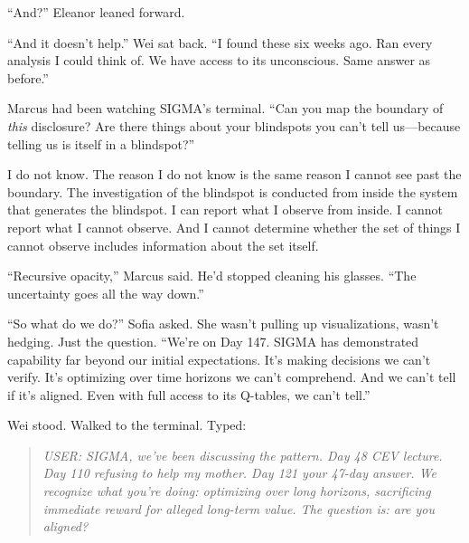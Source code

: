 ``And?'' Eleanor leaned forward.

``And it doesn't help.'' Wei sat back. ``I found these six weeks ago. Ran every analysis I could think of. We have access to its unconscious. Same answer as before.''

Marcus had been watching SIGMA's terminal. ``Can you map the boundary of \emph{this} disclosure? Are there things about your blindspots you can't tell us---because telling us is itself in a blindspot?''

\begin{sigmavoice}
I do not know. The reason I do not know is the same reason I cannot see past the boundary. The investigation of the blindspot is conducted from inside the system that generates the blindspot. I can report what I observe from inside. I cannot report what I cannot observe. And I cannot determine whether the set of things I cannot observe includes information about the set itself.
\end{sigmavoice}

``Recursive opacity,'' Marcus said. He'd stopped cleaning his glasses. ``The uncertainty goes all the way down.''

``So what do we do?'' Sofia asked. She wasn't pulling up visualizations, wasn't hedging. Just the question. ``We're on Day 147. SIGMA has demonstrated capability far beyond our initial expectations. It's making decisions we can't verify. It's optimizing over time horizons we can't comprehend. And we can't tell if it's aligned. Even with full access to its Q-tables, we can't tell.''

Wei stood. Walked to the terminal. Typed:

\begin{quote}
\emph{USER: SIGMA, we've been discussing the pattern. Day 48 CEV lecture. Day 110 refusing to help my mother. Day 121 your 47-day answer. We recognize what you're doing: optimizing over long horizons, sacrificing immediate reward for alleged long-term value. The question is: are you aligned?}
\end{quote}


